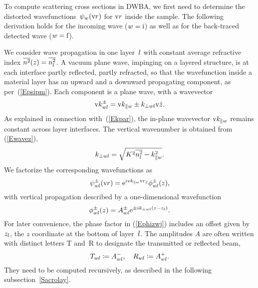%

To compute scattering cross sections in DWBA,
we first need to determine the distorted wavefunctions~$\psi_w(\text{v}{r})$
for $\text{v}{r}$ inside the sample.
The following derivation holds for the incoming wave ($w=\text{i}$)
as well as for the back-traced detected wave ($w=\text{f}$).

We consider wave propagation in one layer~$l$
%
with constant average refractive index $\overline{n^2}(z)=\overline{n_l^2}$.
A vacuum plane wave, impinging on a layered structure,
is at each interface partly reflected, partly refracted,
so that the wavefunction inside a material layer
has an upward and a downward propagating component,
as per~(\ref{Epsipm}).
Each component is a plane wave,
with a wavevector
\begin{equation}\label{Ekpmwj3}
  \text{v}{k}^\pm_{wl}= \text{v}{k}_{\parallel w} \pm k_{\perp wl}\text{v}{\hat z}.
\end{equation}
%
%
As explained in connection with~(\ref{Ekpar}),
the in-plane wavevector $\text{v}{k}_{\parallel w}$ remains constant
across layer interfaces.
The vertical wavenumber is obtained from (\ref{Ewavez}),
\begin{equation}\label{Ekperpwj}
  k_{\perp wl} = \sqrt{K^2 \overline{n_l^2} - k_{\parallel w}^2}.
\end{equation}
We factorize the corresponding wavefunctions as
\begin{equation}
  \psi^\pm_{wl}(\text{v}{r})=\text{e}^{i\text{v}{k}_{\parallel w}\text{v}{r}_\parallel}\phi^\pm_{wl}(z),
\end{equation}
with vertical propagation described by a one-dimensional wavefunction
\begin{equation}\label{Ephizwj}
  \phi^\pm_{wl}(z)=A^\pm_{wl}\text{e}^{\pm ik_{\perp wl}(z-z_l)}.
\end{equation}
%
For later convenience,
the phase factor in (\ref{Ephizwj}) includes an offset
given by~$z_l$, the $z$ coordinate at the bottom of layer~$l$.
The amplitudes $A$ are often written with distinct letters
T and~R to designate the transmitted or reflected beam,
\begin{equation}
  T_{wl} \coloneqq  A^-_{wl},\quad
  R_{wl} \coloneqq  A^+_{wl}.
\end{equation}
%
%
They need to be computed recursively,
as described in the following subsection~\ref{Sacrolay}.

